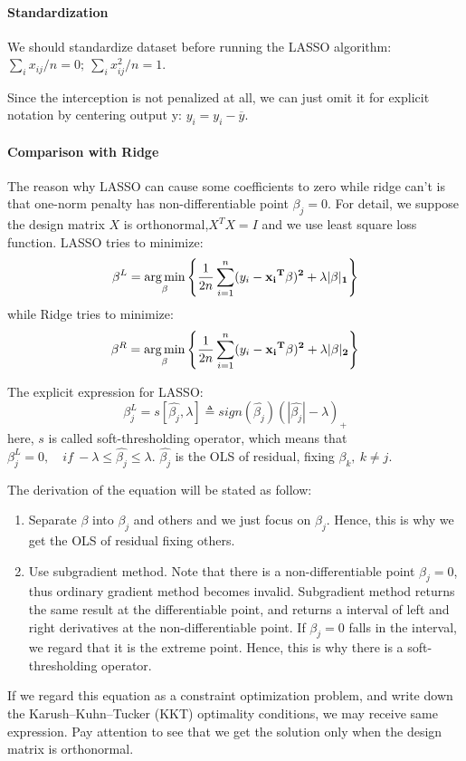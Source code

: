 \documentclass[]{article}
\begin{document}
\paragraph{Standardization}
We should standardize dataset before running the LASSO algorithm:
$\sum_i x_{ij}/n=0;\ \sum_i x_{ij}^2/n=1$.

Since the interception is not penalized at all, we can just omit it for explicit notation by centering output y: $ y_i=y_i-\overline{y} $.

\paragraph{Comparison with Ridge}
The reason why LASSO can cause some coefficients to zero while ridge can't is that one-norm penalty has non-differentiable point $ \beta_j=0 $. For detail, we suppose the design matrix $ X $ is orthonormal,$ X^TX=I $ and we use least square loss function. LASSO tries to minimize:
\begin{equation}
\beta^L =\mathop{\arg\min}_{\beta} \left\{\frac{1}{2n}\sum_{i=1}^n (y_i-\bf{x_i}^T\beta)^2+\lambda|\beta|_1\right\} 
\end{equation}
while Ridge tries to minimize:
\begin{equation}
\beta^R =\mathop{\arg\min}_{\beta} \left\{\frac{1}{2n}\sum_{i=1}^n (y_i-\bf{x_i}^T\beta)^2+\lambda|\beta|_2\right\}
\end{equation}

The explicit expression for LASSO:
\begin{equation} 
{\beta_j^{L}}=s[\hat{\beta_j},\lambda]\triangleq sign(\hat{\beta_j})(|\hat{\beta_j}|-\lambda)_+
\end{equation}
here, $ s $ is called soft-thresholding operator, which means that $ \beta_j^L=0,\quad if\ -\lambda\leq\hat{\beta_j}\leq\lambda $. $ \hat{\beta_j} $ is the OLS of residual, fixing $\beta_k,\ k\neq j$.

The derivation of the equation will be stated as follow:
\begin{enumerate}
	\item Separate $ \beta $ into $ \beta_j $ and others and we just focus on $ \beta_j $. Hence, this is why we get the OLS of residual fixing others.
	\item Use subgradient\cite{held1974validation} method. Note that there is a non-differentiable point $ \beta_j=0 $, thus ordinary gradient method becomes invalid. Subgradient method returns the same result at the differentiable point, and returns a interval of left and right derivatives at the non-differentiable point. If $ \beta_j=0 $ falls in the interval, we regard that it is the extreme point. Hence, this is why there is a soft-thresholding operator.
\end{enumerate}
If we regard this equation as a constraint optimization problem, and write down the Karush–Kuhn–Tucker (KKT)\cite{wu2007karush} optimality conditions, we may receive same expression. Pay attention to see that we get the solution only when the design matrix is orthonormal.
\end{document}
